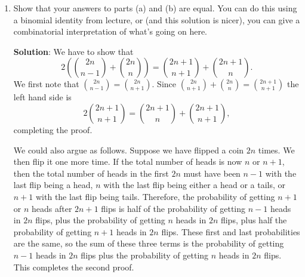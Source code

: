 \documentclass[11pt]{article}
\begin{document}
\begin{enumerate}
\begin{enumerate}
{\bf Solution}: There are $2^{2n+1}$ total sequences of coin flips.  There are $\binom{2n+1}{n+1}$ ways to get $n+1$ heads exactly and $\binom{2n+1}{n}$ ways to get $n$ heads exactly.  Therefore this probability is
\[
\frac{\binom{2n+1}{n+1}+\binom{2n+1}{n}}{2^{2n+1}}.
\]

\item Show that your answers to parts (a) and (b) are equal.  You can do this using a binomial identity from lecture, or (and this solution is nicer), you can give a combinatorial interpretation of what's going on here.


{\bf Solution}: We have to show that 
\[
2 \left(\binom{2n}{n-1}+\binom{2n}{n}\right) = \binom{2n+1}{n+1}+\binom{2n+1}{n}.
\]
We first note that $\binom{2n}{n-1} = \binom{2n}{n+1}$.  Since $\binom{2n}{n+1} + \binom{2n}{n} = \binom{2n+1}{n+1}$ the left hand side is 
\[ 
2 \binom{2n+1}{n+1} = \binom{2n+1}{n}+\binom{2n+1}{n+1},
\]
completing the proof.  

We could also argue as follows.  Suppose we have flipped a coin $2n$ times.  We then flip it one more time.  If the total number of heads is now $n$ or $n+1$, then the total number of heads in the first $2n$ must have been $n-1$ with the last flip being a head, $n$ with the last flip being either a head or a tails, or $n+1$ with the last flip being tails.  Therefore, the probability of getting $n+1$ or $n$ heads after $2n+1$ flips is half of the probability of getting $n-1$ heads in $2n$ flips, plus the probability of getting $n$ heads in $2n$ flips, plus half the probability of getting $n+1$ heads in $2n$ flips.  These first and last probabilities are the same, so the sum of these three terms is the probability of getting $n-1$ heads in $2n$ flips plus the probability of getting $n$ heads in $2n$ flips.  This completes the second proof.
\end{enumerate}



\end{enumerate}
\end{document}
